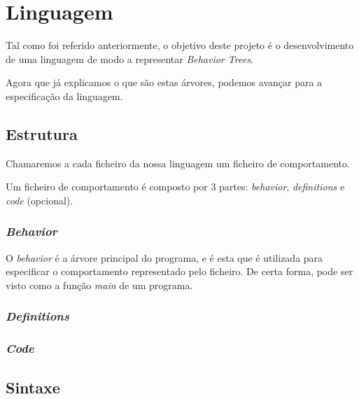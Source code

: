 
\chapter{Linguagem} %

\label{Chapter3} %

Tal como foi referido anteriormente, o objetivo deste projeto é o desenvolvimento de uma linguagem de modo a representar \textit{Behavior Trees}.

Agora que já explicamos o que são estas árvores, podemos avançar para a especificação da linguagem.

\section{Estrutura}
Chamaremos a cada ficheiro da nossa linguagem um ficheiro de comportamento.

Um ficheiro de comportamento é composto por 3 partes: \textit{behavior}, \textit{definitions} e \textit{code} (opcional).

\subsection{\textit{Behavior}}
O \textit{behavior} é a árvore principal do programa, e é esta que é utilizada para especificar o comportamento representado pelo ficheiro.
De certa forma, pode ser visto como a função \textit{main} de um programa.

\subsection{\textit{Definitions}}


\subsection{\textit{Code}}


\section{Sintaxe}



